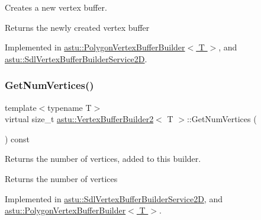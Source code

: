 Creates a new vertex buffer.

\begin{DoxyReturn}{Returns}
the newly created vertex buffer 
\end{DoxyReturn}


Implemented in \hyperlink{classastu_1_1PolygonVertexBufferBuilder_a4e598b21be17c556a444da88f2388319}{astu\+::\+Polygon\+Vertex\+Buffer\+Builder$<$ T $>$}, and \hyperlink{classastu_1_1SdlVertexBufferBuilderService2D_ad1825ce136ba0b4e8ef53fba3266f3af}{astu\+::\+Sdl\+Vertex\+Buffer\+Builder\+Service2D}.

\mbox{\label{classastu_1_1VertexBufferBuilder2_ae715cb61f66200f1971b2bd6142b1715}} 
\subsubsection{\texorpdfstring{Get\+Num\+Vertices()}{GetNumVertices()}}
{\footnotesize\ttfamily template$<$typename T$>$ \\
virtual size\+\_\+t \hyperlink{classastu_1_1VertexBufferBuilder2}{astu\+::\+Vertex\+Buffer\+Builder2}$<$ T $>$\+::Get\+Num\+Vertices (\begin{DoxyParamCaption}{ }\end{DoxyParamCaption}) const\hspace{0.3cm}{\ttfamily [pure virtual]}}

Returns the number of vertices, added to this builder.

\begin{DoxyReturn}{Returns}
the number of vertices 
\end{DoxyReturn}


Implemented in \hyperlink{classastu_1_1SdlVertexBufferBuilderService2D_a82b6c9eaeff1583edc3e42e6b1857b70}{astu\+::\+Sdl\+Vertex\+Buffer\+Builder\+Service2D}, and \hyperlink{classastu_1_1PolygonVertexBufferBuilder_a4fd022aa954b7f41db8c34349286e3e3}{astu\+::\+Polygon\+Vertex\+Buffer\+Builder$<$ T $>$}.

\mbox{\label{classastu_1_1VertexBufferBuilder2_ae9ecf15e9ddafcdac089ebe61e37a242}} 
